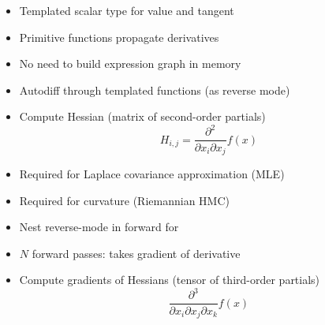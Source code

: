 \documentclass[10pt]{report}
\begin{document}
\begin{itemize}
\item Templated scalar type for value and tangent
\item Primitive functions propagate derivatives
\item No need to build expression graph in memory
\item Autodiff through templated functions (as reverse mode)
\end{itemize}

%
\begin{itemize}
\item Compute Hessian (matrix of second-order partials)  
\[
H_{i,j} = \frac{\partial^2}{\partial x_i \partial x_j} f(x)
\]
\item Required for Laplace covariance approximation (MLE)
\item Required for curvature (Riemannian HMC)
\item Nest reverse-mode in forward for  
\item $N$ forward passes: takes gradient of derivative
\end{itemize}


\begin{itemize}
\item Compute gradients of Hessians (tensor of third-order partials)
\[
\frac{\partial^3}{\partial x_i \partial x_j \partial x_k} f(x)
\]
\vspace*{-12pt}
\end{itemize}
\end{document}
